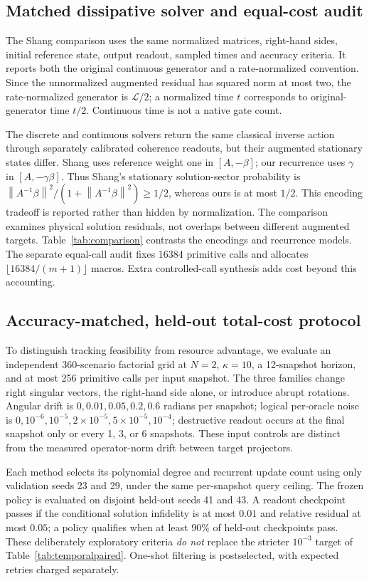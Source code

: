 \documentclass{ieeeaccess}
\newcommand{\norm}[1]{\left\lVert #1\right\rVert}
\begin{document}
\subsection{Matched dissipative solver and equal-cost audit}
The Shang comparison uses the same normalized matrices, right-hand sides, initial reference state, output readout, sampled times and accuracy criteria. It reports both the original continuous generator and a rate-normalized convention. Since the unnormalized augmented residual has squared norm at most two, the rate-normalized generator is $\mathcal L/2$; a normalized time $t$ corresponds to original-generator time $t/2$. Continuous time is not a native gate count.

The discrete and continuous solvers return the same classical inverse action through separately calibrated coherence readouts, but their augmented stationary states differ. Shang uses reference weight one in $[A,-\beta]$; our recurrence uses $\gamma$ in $[A,-\gamma\beta]$. Thus Shang's stationary solution-sector probability is $\norm{A^{-1}\beta}^2/(1+\norm{A^{-1}\beta}^2)\ge1/2$, whereas ours is at most $1/2$. This encoding tradeoff is reported rather than hidden by normalization. The comparison examines physical solution residuals, not overlaps between different augmented targets. Table~\ref{tab:comparison} contrasts the encodings and recurrence models. The separate equal-call audit fixes 16384 primitive calls and allocates $\lfloor16384/(m+1)\rfloor$ macros. Extra controlled-call synthesis adds cost beyond this accounting.



\subsection{Accuracy-matched, held-out total-cost protocol}
\label{sec:costprotocol}
To distinguish tracking feasibility from resource advantage, we evaluate an independent $360$-scenario factorial grid at $N=2$, $\kappa=10$, a 12-snapshot horizon, and at most 256 primitive calls per input snapshot. The three families change right singular vectors, the right-hand side alone, or introduce abrupt rotations. Angular drift is $0,0.01,0.05,0.2,0.6$ radians per snapshot; logical per-oracle noise is $0,10^{-6},10^{-5},2\times10^{-5},5\times10^{-5},10^{-4}$; destructive readout occurs at the final snapshot only or every 1, 3, or 6 snapshots. These input controls are distinct from the measured operator-norm drift between target projectors.

Each method selects its polynomial degree and recurrent update count using only validation seeds 23 and 29, under the same per-snapshot query ceiling. The frozen policy is evaluated on disjoint held-out seeds 41 and 43. A readout checkpoint passes if the conditional solution infidelity is at most $0.01$ and relative residual at most $0.05$; a policy qualifies when at least 90\% of held-out checkpoints pass. These deliberately exploratory criteria \emph{do not} replace the stricter $10^{-3}$ target of Table~\ref{tab:temporalpaired}. One-shot filtering is postselected, with expected retries charged separately.
\end{document}
